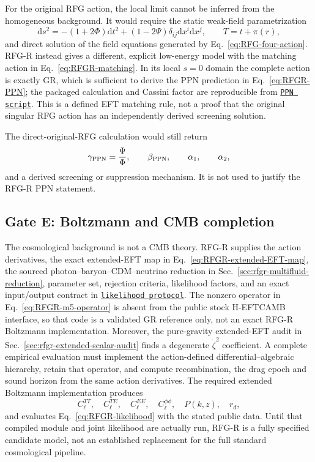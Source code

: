 \documentclass[11pt,a4paper]{article}
\renewcommand{\dd}{\mathrm{d}}
\newcommand{\RFGRepoURL}{https://github.com/MartinPetrasek123/MartinPetrasek123}
\newcommand{\RFGRepoNamed}[2]{\href{\RFGRepoURL/blob/main/r-universe-complete-chain/rfg-r-completion/r\_universe\_completion/#1}{\texttt{#2}}}
\begin{document}
For the original RFG action, the local limit cannot be inferred from the
homogeneous background. It would require the static weak-field parametrization
\[
\dd s^2=-(1+2\Phi)\dd t^2+(1-2\Psi)\delta_{ij}\dd x^i\dd x^j,
\qquad
T=t+\pi(r),
\]
and direct solution of the field equations generated by Eq.~\eqref{eq:RFG-four-action}. RFG-R instead gives a different, explicit low-energy model with the matching action in Eq.~\eqref{eq:RFGR-matching}. In its local \(s=0\) domain the complete action is exactly GR, which is sufficient to derive the PPN prediction in Eq.~\eqref{eq:RFGR-PPN}; the packaged calculation and Cassini factor are reproducible from \RFGRepoNamed{scripts/ppn\_likelihood.py}{PPN script}. This is a defined EFT matching rule, not a proof that the original singular RFG action has an independently derived screening solution.

The direct-original-RFG calculation would still return
\[
\gamma_{\rm PPN}=\frac{\Psi}{\Phi},\qquad
\beta_{\rm PPN},\qquad
\alpha_1,\qquad
\alpha_2,
\]
and a derived screening or suppression mechanism. It is not used to justify the RFG-R PPN statement.

\subsection{Gate E: Boltzmann and CMB completion}

The cosmological background is not a CMB theory. RFG-R supplies the action derivatives, the exact extended-EFT map in Eq.~\eqref{eq:RFGR-extended-EFT-map}, the sourced photon--baryon--CDM--neutrino reduction in Sec.~\ref{sec:rfgr-multifluid-reduction}, parameter set, rejection criteria, likelihood factors, and an exact input/output contract in \RFGRepoNamed{docs/likelihood\_pipeline.md}{likelihood protocol}.  The nonzero operator in Eq.~\eqref{eq:RFGR-m5-operator} is absent from the public stock H-EFTCAMB interface, so that code is a validated GR reference only, not an exact RFG-R Boltzmann implementation. Moreover, the pure-gravity extended-EFT audit in Sec.~\ref{sec:rfgr-extended-scalar-audit} finds a degenerate \(\dot\zeta^2\) coefficient. A complete empirical evaluation must implement the action-defined differential--algebraic hierarchy, retain that operator, and compute recombination, the drag epoch and sound horizon from the same action derivatives. The required extended Boltzmann implementation produces
\[
C_\ell^{TT},\quad C_\ell^{TE},\quad C_\ell^{EE},\quad
C_\ell^{\phi\phi},\quad P(k,z),\quad r_d,
\]
and evaluates Eq.~\eqref{eq:RFGR-likelihood} with the stated public data. Until that compiled module and joint likelihood are actually run, RFG-R is a fully specified candidate model, not an established replacement for the full standard cosmological pipeline.
\end{document}

